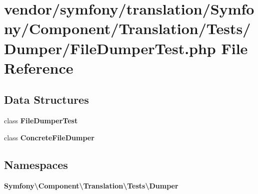 \section{vendor/symfony/translation/\+Symfony/\+Component/\+Translation/\+Tests/\+Dumper/\+File\+Dumper\+Test.php File Reference}
\label{_file_dumper_test_8php}
\subsection*{Data Structures}
\begin{DoxyCompactItemize}
\item 
class {\bf File\+Dumper\+Test}
\item 
class {\bf Concrete\+File\+Dumper}
\end{DoxyCompactItemize}
\subsection*{Namespaces}
\begin{DoxyCompactItemize}
\item 
 {\bf Symfony\textbackslash{}\+Component\textbackslash{}\+Translation\textbackslash{}\+Tests\textbackslash{}\+Dumper}
\end{DoxyCompactItemize}
